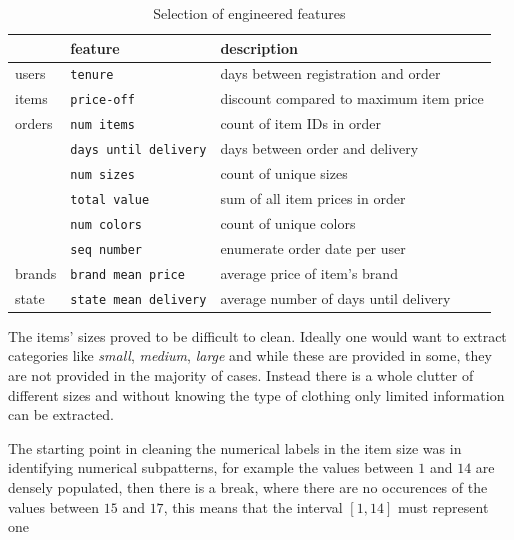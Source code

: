 \begin{table}
\centering
\caption{Selection of engineered features}
\tiny
\label{features-tab}
\begin{tabular}{@{}lll@{}}
       & feature             & description                           \\ \midrule
users  & \texttt{tenure}              & days between registration and order        \\
items  & \texttt{price-off}           & discount compared to maximum item price    \\
orders & \texttt{num items}           & count of item IDs in order                 \\
       & \texttt{days until delivery} & days between order and delivery            \\
       & \texttt{num sizes}           & count of unique sizes                      \\
       & \texttt{total value}         & sum of all item prices in order            \\
       & \texttt{num colors}          & count of unique colors                     \\
       & \texttt{seq number}          & enumerate order date per user              \\
brands & \texttt{brand mean price}    & average price of item's brand              \\
state  & \texttt{state mean delivery} & average number of days until delivery
\end{tabular}
\end{table}

The items' sizes proved to be difficult to clean. Ideally one would want to extract categories like \textit{small}, \textit{medium}, \textit{large} and while these are provided in some, they are not provided in the majority of cases. Instead there is a whole clutter of different sizes and without knowing the type of clothing only limited information can be extracted.

The starting point in cleaning the numerical labels in the item size was in identifying numerical subpatterns, for example the values between $1$ and $14$ are densely populated, then there is a break, where there are no occurences of the values between $15$ and $17$, this means that the interval $[1, 14]$ must represent one {\par}


